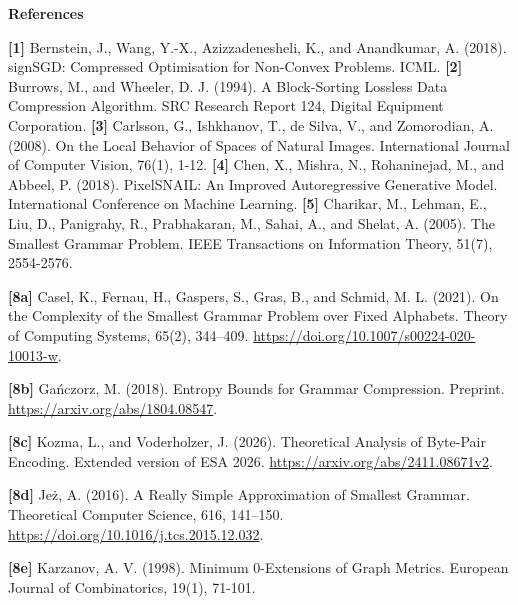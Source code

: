 \documentclass[
]{article}
\begin{document}
\textbf{References}

\textbf{{[}1{]}} Bernstein, J., Wang, Y.-X., Azizzadenesheli, K., and
Anandkumar, A. (2018). signSGD: Compressed Optimisation for Non-Convex
Problems. ICML.
\textbf{{[}2{]}} Burrows, M., and Wheeler, D. J. (1994). A Block-Sorting
Lossless Data Compression Algorithm. SRC Research Report 124, Digital
Equipment Corporation.
\textbf{{[}3{]}} Carlsson, G., Ishkhanov, T., de Silva, V., and
Zomorodian, A. (2008). On the Local Behavior of Spaces of Natural
Images. International Journal of Computer Vision, 76(1), 1-12.
\textbf{{[}4{]}} Chen, X., Mishra, N., Rohaninejad, M., and Abbeel, P.
(2018). PixelSNAIL: An Improved Autoregressive Generative Model.
International Conference on Machine Learning.
\textbf{{[}5{]}} Charikar, M., Lehman, E., Liu, D., Panigrahy, R.,
Prabhakaran, M., Sahai, A., and Shelat, A. (2005). The Smallest Grammar
Problem. IEEE Transactions on Information Theory, 51(7), 2554-2576.

\textbf{{[}8a{]}} Casel, K., Fernau, H., Gaspers, S., Gras, B.,
and Schmid, M. L. (2021). On the Complexity of the Smallest Grammar Problem
over Fixed Alphabets. Theory of Computing Systems, 65(2), 344--409.
\url{https://doi.org/10.1007/s00224-020-10013-w}.

\textbf{{[}8b{]}} Ga\'nczorz, M. (2018).
Entropy Bounds for Grammar Compression. Preprint.
\url{https://arxiv.org/abs/1804.08547}.

\textbf{{[}8c{]}} Kozma, L., and Voderholzer, J. (2026).
Theoretical Analysis of Byte-Pair Encoding. Extended version of ESA 2026.
\url{https://arxiv.org/abs/2411.08671v2}.

\textbf{{[}8d{]}} Je\.z, A. (2016). A Really Simple Approximation of
Smallest Grammar. Theoretical Computer Science, 616, 141--150.
\url{https://doi.org/10.1016/j.tcs.2015.12.032}.

\textbf{{[}8e{]}} Karzanov, A. V. (1998). Minimum 0-Extensions of Graph
Metrics. European Journal of Combinatorics, 19(1), 71-101.
\end{document}
